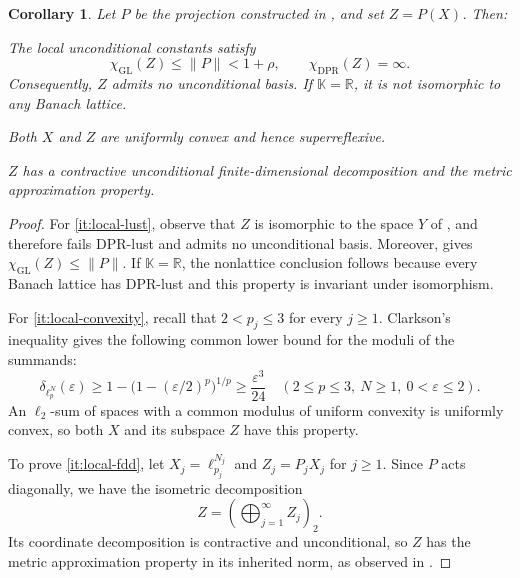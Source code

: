 \documentclass[11pt,a4paper,reqno]{amsart}
\newtheorem{corollary}[corollary]{Corollary}
\theoremstyle{definition}
\newcommand{\R}{\mathbb R}
\newcommand{\norm}[1]{\lVert #1\rVert}
\numberwithin{equation}{section}
\begin{document}
\begin{corollary}\label{cor:range-not-lattice}\label{cor:local-structure}
Let $P$ be the projection constructed in , and set $Z=P(X)$. Then:
\begin{resultparts}
\item\label{it:local-lust}
The local unconditional constants satisfy
\begin{equation*}
 \chi_{\mathrm{GL}}(Z)\leq\norm P<1+\rho,
 \qquad \chi_{\mathrm{DPR}}(Z)=\infty.
\end{equation*}
Consequently, $Z$ admits no unconditional basis. If $\mathbb K=\R$, it is not isomorphic to any Banach lattice.
\item\label{it:local-convexity}
Both $X$ and $Z$ are uniformly convex and hence superreflexive.
\item\label{it:local-fdd}
$Z$ has a contractive unconditional finite-dimensional decomposition and the metric approximation property.
\end{resultparts}
\end{corollary}

\begin{proof}
For \ref{it:local-lust}, observe that $Z$ is isomorphic to the space $Y$ of , and therefore fails DPR-lust and admits no unconditional basis. Moreover,  gives $\chi_{\mathrm{GL}}(Z)\leq\norm P$. If $\mathbb K=\R$, the nonlattice conclusion follows because every Banach lattice has DPR-lust and this property is invariant under isomorphism.

For \ref{it:local-convexity}, recall that $2<p_j\leq3$ for every $j\geq1$. Clarkson's inequality \cite[Theorem~2]{Clarkson1936} gives the following common lower bound for the moduli of the summands:
\begin{equation*}
 \delta_{\ell_p^N}(\varepsilon)
 \geq1-\bigl(1-(\varepsilon/2)^p\bigr)^{1/p}
 \geq\frac{\varepsilon^3}{24}
 \quad(2\leq p\leq3,\ N\geq1,\ 0<\varepsilon\leq2).
\end{equation*}
An $\ell_2$-sum of spaces with a common modulus of uniform convexity is uniformly convex, so both $X$ and its subspace $Z$ have this property.

To prove \ref{it:local-fdd}, let $X_j=\ell_{p_j}^{N_j}$ and $Z_j=P_jX_j$ for $j\geq1$. Since $P$ acts diagonally, we have the isometric decomposition
\begin{equation*}
 Z=\left(\bigoplus_{j=1}^{\infty}Z_j\right)_2.
\end{equation*}
Its coordinate decomposition is contractive and unconditional, so $Z$ has the metric approximation property in its inherited norm, as observed in .
\end{proof}
\end{document}
